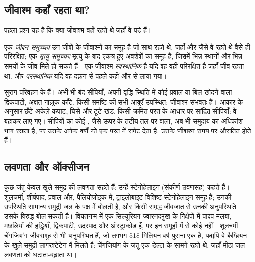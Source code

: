 \subsection*{जीवाश्म कहाँ रहता था?}

पहला प्रश्न यह है कि क्या जीवाश्म वहीं रहते थे जहाँ वे पड़े हैं।

\begin{definition}[जीवन और मृत्यु समुच्चय; स्वस्थानिक और परस्थानिक जीवाश्म]\label{def:b2:palaeoenvironments:assemblages}
एक \emph{जीवन-समुच्चय} उन जीवों के जीवाश्मों का समूह है जो
साथ रहते थे, जहाँ और जैसे वे रहते थे वैसे ही परिरक्षित; एक \emph{मृत्यु-समुच्चय}
मृत्यु के बाद एकत्र हुए अवशेषों का समूह है, जिसमें भिन्न स्थानों और
भिन्न समयों के जीव मिले हो सकते हैं। एक जीवाश्म \emph{स्वस्थानिक} है यदि वह
वहीं परिरक्षित है जहाँ जीव रहता था, और \emph{परस्थानिक} यदि वह
दफ़न से पहले कहीं और से लाया गया।
\end{definition}

सुराग परिवहन के हैं। अभी भी बंद सीपियाँ, अपनी वृद्धि-स्थिति में कोई प्रवाल या बिल खोदने वाला द्विकपाटी,
अक्षत नाज़ुक काँटे, किसी समष्टि की सभी आयुएँ उपस्थित: जीवाश्म
संभवतः  हैं। आकार के अनुसार छँटे अकेले कपाट, घिसे और टूटे खंड, किसी क्रमित परत के आधार पर
सांद्रित सीपियाँ: वे बहाकर लाए गए। सीपियों का कोई , जैसे
ऊपर के तटीय तल पर वाला, अब भी समुदाय का अधिकांश भाग रखता है, पर उसके अनेक वर्षों को
एक परत में समेट देता है: उसके जीवाश्म समय पर औसतित होते हैं।

\subsection*{लवणता और ऑक्सीजन}

कुछ जंतु केवल खुले समुद्र की लवणता सहते हैं: उन्हें स्टेनोहेलाइन (संकीर्ण-लवणसह) कहते हैं। शूलचर्मी,
शीर्षपाद, प्रवाल और, पैलियोज़ोइक में, ट्राइलोबाइट विशिष्ट स्टेनोहेलाइन समूह हैं; उनकी
उपस्थिति सामान्य समुद्री जल के पक्ष में बोलती है, और किसी समृद्ध जीवजात से उनकी अनुपस्थिति उसके विरुद्ध बोल सकती है।
वियतनाम में एक सिल्यूरियन ज्वारनदमुख के निक्षेपों में पादप-मलबा, मछलियों की हड्डियाँ, द्विकपाटी, उदरपाद
और ऑस्ट्राकोड हैं, पर इन समूहों में से कोई नहीं। शूलचर्मी चेंगजियांग जीवसमूह से भी अनुपस्थित हैं,
जो लगभग 518 मिलियन वर्ष पुराना एक  है, यद्यपि वे कैम्ब्रियन के खुले-समुद्री लागरश्टेटेन में
मिलते हैं: चेंगजियांग के जंतु एक डेल्टा के सामने रहते थे, जहाँ मीठा जल लवणता को घटाता-बढ़ाता था।

